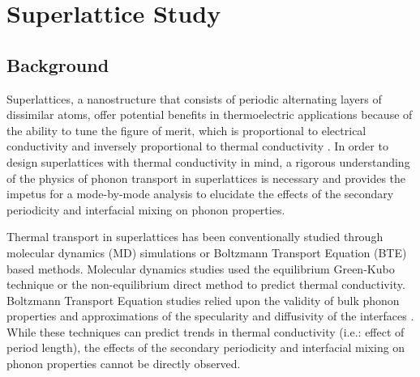\chapter{Superlattice Study}\label{CHP:SL}

\section{Background}

Superlattices, a nanostructure that consists of periodic alternating layers of dissimilar atoms, offer potential benefits in thermoelectric applications because of the ability to tune the figure of merit, which is proportional to electrical conductivity and inversely proportional to thermal conductivity \cite{broido1995effect,balandin2003mechanism,kim2006thermal}. In order to design superlattices with thermal conductivity in mind, a rigorous understanding of the physics of phonon transport in superlattices is necessary and provides the impetus for a mode-by-mode analysis to elucidate the effects of the secondary periodicity and interfacial mixing on phonon properties.

Thermal transport in superlattices has been conventionally studied through molecular dynamics (MD) simulations or Boltzmann Transport Equation (BTE) based methods. Molecular dynamics studies used the equilibrium Green-Kubo \cite {PhysRevB.85.195302} technique or the non-equilibrium \cite{PhysRevB.79.214307,PhysRevB.72.174302} direct method to predict thermal conductivity. Boltzmann Transport Equation studies relied upon the validity of bulk phonon properties \cite{walkauskas:2579,chen:220} and approximations of the specularity and diffusivity of the interfaces \cite{PhysRevB.57.14958}. While these techniques can predict trends in thermal conductivity (i.e.: effect of period length), the effects of the secondary periodicity and interfacial mixing on phonon properties cannot be directly observed.

